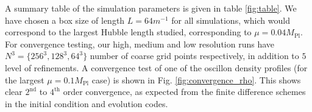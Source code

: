 \documentclass[
    reprint,
    preprintnumbers,
    superscriptaddress,
    nofootinbib,
     amsmath,amssymb,
     aps,
     prd,
    floatfix,
    ]{revtex4-2}
\newcommand{\mpl}{M_\mathrm{Pl}}
\begin{document}
A summary table of the simulation parameters is given in table \ref{fig:table}. We have chosen a box size of length $L=64m^{-1}$ for all simulations, which would correspond to the largest Hubble length studied, corresponding to $\mu=0.04\mpl$. For convergence testing, our high, medium and low resolution runs have $N^3=\lbrace 256^3,128^3,64^3\rbrace$ number of coarse grid points respectively, in addition to $5$ level of refinements. A convergence test of one of the oscillon density profiles (for the largest $\mu=0.1\mpl$ case) is shown in Fig. \ref{fig:convergence_rho}. This shows clear $2^\mathrm{nd}$ to $4^\mathrm{th}$ order convergence, as expected from the finite difference schemes in the initial condition and evolution codes.
\end{document}
